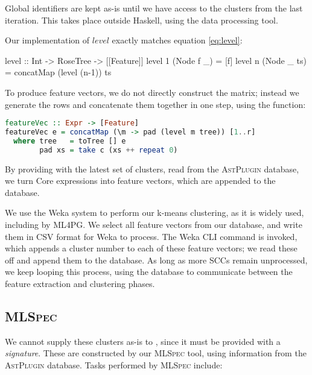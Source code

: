 Global identifiers are kept as-is until we have access to the clusters from the
last iteration. This takes place outside Haskell, using the  data
processing tool.

Our implementation of $level$ exactly matches equation \ref{eq:level}:

\begin{haskell}
level :: Int -> RoseTree -> [[Feature]]
level 1 (Node f _)  = [f]
level n (Node _ ts) = concatMap (level (n-1)) ts
\end{haskell}

To produce feature vectors, we do not directly construct the matrix; instead we
generate the rows and concatenate them together in one step, using the
 function:

\begin{lstlisting}[language=Haskell, xleftmargin=0.1\textwidth, xrightmargin=0.1\textwidth]
featureVec :: Expr -> [Feature]
featureVec e = concatMap (\m -> pad (level m tree)) [1..r]
  where tree   = toTree [] e
        pad xs = take c (xs ++ repeat 0)
\end{lstlisting}

By providing  with the latest set of clusters, read from the
\textsc{AstPlugin} database, we turn Core expressions into feature vectors,
which are appended to the database.

We use the Weka system to perform our k-means clustering, as it is widely used,
including by ML4PG. We select all feature vectors from our database, and write
them in CSV format for Weka to process. The Weka CLI command is invoked, which
appends a cluster number to each of these feature vectors; we read these off and
append them to the database. As long as more SCCs remain unprocessed, we keep
looping this process, using the database to communicate between the feature
extraction and clustering phases.

\subsection{\textsc{MLSpec}}
\label{sec:mlspec}

We cannot supply these clusters as-is to \qspec{}, since it must be provided
with a \emph{signature}. These are constructed by our \textsc{MLSpec} tool,
using information from the \textsc{AstPlugin} database. Tasks performed by
\textsc{MLSpec} include:


